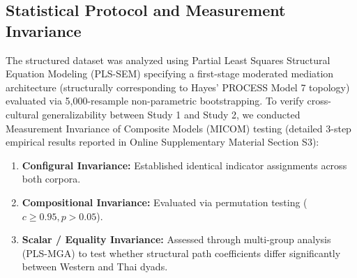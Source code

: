 \subsection{Statistical Protocol and Measurement Invariance}
The structured dataset was analyzed using Partial Least Squares Structural Equation Modeling (PLS-SEM) specifying a first-stage moderated mediation architecture (structurally corresponding to Hayes' PROCESS Model 7 topology) evaluated via 5,000-resample non-parametric bootstrapping. To verify cross-cultural generalizability between Study 1 and Study 2, we conducted Measurement Invariance of Composite Models (MICOM) testing \citep{henseler2016testing,hair2019use} (detailed 3-step empirical results reported in Online Supplementary Material Section S3):
\begin{enumerate}[leftmargin=*]
    \item \textbf{Configural Invariance:} Established identical indicator assignments across both corpora.
    \item \textbf{Compositional Invariance:} Evaluated via permutation testing ($c \ge 0.95, p > 0.05$).
    \item \textbf{Scalar / Equality Invariance:} Assessed through multi-group analysis (PLS-MGA) to test whether structural path coefficients differ significantly between Western and Thai dyads.
\end{enumerate}
